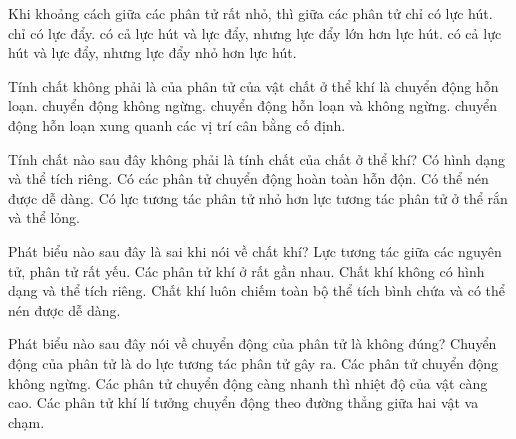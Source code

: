 \begin{ex}
Khi khoảng cách giữa các phân tử rất nhỏ, thì giữa các phân tử
\choice
{chỉ có lực hút.}
{chỉ có lực đẩy.}
{\True có cả lực hút và lực đẩy, nhưng lực đẩy lớn hơn lực hút.}
{có cả lực hút và lực đẩy, nhưng lực đẩy nhỏ hơn lực hút.}
\end{ex}


\begin{ex}
Tính chất không phải là của phân tử của vật chất ở thể khí là
\choice
{chuyển động hỗn loạn.}
{chuyển động không ngừng.}
{chuyển động hỗn loạn và không ngừng.}
{\True chuyển động hỗn loạn xung quanh các vị trí cân bằng cố định.}
\end{ex}

\begin{ex}
Tính chất nào sau đây không phải là tính chất của chất ở thể khí?
\choice
{\True Có hình dạng và thể tích riêng.}
{Có các phân tử chuyển động hoàn toàn hỗn độn.}
{Có thể nén được dễ dàng.}
{Có lực tương tác phân tử nhỏ hơn lực tương tác phân tử ở thể rắn và thể lỏng.}
\end{ex}

\begin{ex}
Phát biểu nào sau đây là sai khi nói về chất khí?
\choice
{Lực tương tác giữa các nguyên tử, phân tử rất yếu.}
{\True Các phân tử khí ở rất gần nhau.}
{Chất khí không có hình dạng và thể tích riêng.}
{Chất khí luôn chiếm toàn bộ thể tích bình chứa và có thể nén được dễ dàng.}
\end{ex}


\begin{ex}
Phát biểu nào sau đây nói về chuyển động của phân tử là không đúng?
\choice
{\True Chuyển động của phân tử là do lực tương tác phân tử gây ra.}
{Các phân tử chuyển động không ngừng.}
{Các phân tử chuyển động càng nhanh thì nhiệt độ của vật càng cao.}
{Các phân tử khí lí tưởng chuyển động theo đường thẳng giữa hai vật va chạm.}
\end{ex}


